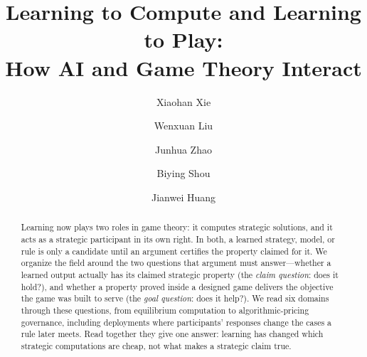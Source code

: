\documentclass[a4paper,fleqn]{cas-sc}
\begin{document}
\let\WriteBookmarks\relax
\def\floatpagepagefraction{1}
\def\textpagefraction{.001}

\title [mode = title]{Learning to Compute and Learning to Play:\\
How AI and Game Theory Interact}

\author[1]{Xiaohan Xie}
\author[2]{Wenxuan Liu}
\author[1]{Junhua Zhao}
\author[3]{Biying Shou}
\author[1]{Jianwei Huang}
\cormark[1]



\begin{abstract}
Learning now plays two roles in game theory: it computes strategic solutions, and it
acts as a strategic participant in its own right. In both, a learned strategy, model,
or rule is only a candidate until an argument certifies the property claimed for it. We
organize the field around the two questions that argument must answer---whether a
learned output actually has its claimed strategic property (the \emph{claim question}:
does it hold?), and whether a property proved inside a designed game delivers the
objective the game was built to serve (the \emph{goal question}: does it help?). We
read six domains through these questions, from equilibrium computation to
algorithmic-pricing governance, including deployments where participants' responses
change the cases a rule later meets. Read together they give one answer: learning has
changed which strategic computations are cheap, not what makes a strategic claim true.
\end{abstract}

\end{document}
